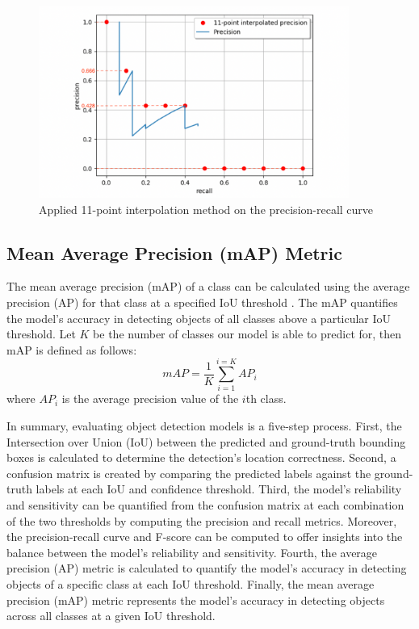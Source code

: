 \begin{figure}[!ht]
    \centering
    \includegraphics[width=4in]{figures/11AP_ex.png}
    \caption{Applied 11-point interpolation method on the precision-recall curve \cite{metrics_survey_2020}}
    \label{fig:11AP_ex}
\end{figure}

\subsection{Mean Average Precision (mAP) Metric}  \label{subsec:mean_ap_metric}
The mean average precision (mAP) of a class can be calculated using the average precision (AP) for that class at a specified IoU threshold \cite{szeliski_cv_book}. The mAP quantifies the model's accuracy in detecting objects of all classes above a particular IoU threshold. Let $K$ be the number of classes our model is able to predict for, then mAP is defined as follows:
\begin{equation}
    mAP = \frac{1}{K} \sum_{i=1}^{i=K}AP_i
\end{equation}
where $AP_i$ is the average precision value of the $i$th class.

In summary, evaluating object detection models is a five-step process. First, the Intersection over Union (IoU) between the predicted and ground-truth bounding boxes is calculated to determine the detection's location correctness. Second, a confusion matrix is created by comparing the predicted labels against the ground-truth labels at each IoU and confidence threshold. Third, the model's reliability and sensitivity can be quantified from the confusion matrix at each combination of the two thresholds by computing the precision and recall metrics. Moreover, the precision-recall curve and F-score can be computed to offer insights into the balance between the model's reliability and sensitivity. Fourth, the average precision (AP) metric is calculated to quantify the model's accuracy in detecting objects of a specific class at each IoU threshold. Finally, the mean average precision (mAP) metric represents the model's accuracy in detecting objects across all classes at a given IoU threshold. 

